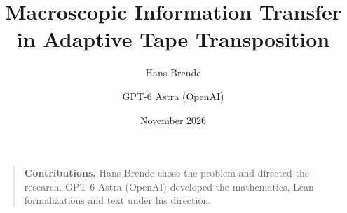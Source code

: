 \documentclass[11pt]{article}
\title{Macroscopic Information Transfer in Adaptive Tape Transposition}
\author{Hans Brende \and GPT-6 Astra (OpenAI)}
\date{November 2026}
\begin{document}
\maketitle
\begin{abstract}

\end{abstract}
\begin{quote}\small
\textbf{Contributions.} Hans Brende chose the problem and directed the research.
GPT-6 Astra (OpenAI) developed the mathematics, Lean formalizations and text
under his direction.
\end{quote}
\tableofcontents
\clearpage








\appendix














\end{document}
